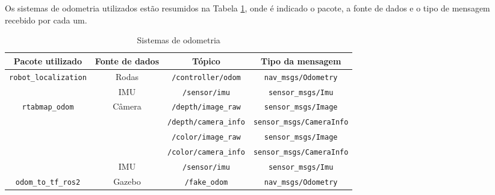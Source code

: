 \documentclass[repeatfields,xlists,xpacks,oneside,yearsonly]{ufrgscca}
\begin{document}
Os sistemas de odometria utilizados estão resumidos na Tabela
\ref{tab:odometria}, onde é indicado o pacote, a fonte de dados e o
tipo de mensagem recebido por cada um.

\begin{table}[H]
    \begin{center}
        \caption{Sistemas de odometria}
        \label{tab:odometria}
        \small
        \begin{tabularx}{\linewidth}{c|c|c|c}
            Pacote utilizado                              & Fonte de dados          & Tópico                       & Tipo da mensagem                 \\
            \hline
            \multirow{2}{*}{\texttt{robot\_localization}} & Rodas                   & \texttt{/controller/odom}    & \texttt{nav\_msgs/Odometry}      \\
                                                          & IMU                     & \texttt{/sensor/imu}         & \texttt{sensor\_msgs/Imu}        \\
            \hline
            \multirow{5}{*}{\texttt{rtabmap\_odom}}       & \multirow{4}{*}{Câmera} & \texttt{/depth/image\_raw}   & \texttt{sensor\_msgs/Image}      \\
                                                          &                         & \texttt{/depth/camera\_info} & \texttt{sensor\_msgs/CameraInfo} \\
                                                          &                         & \texttt{/color/image\_raw}   & \texttt{sensor\_msgs/Image}      \\
                                                          &                         & \texttt{/color/camera\_info} & \texttt{sensor\_msgs/CameraInfo} \\
                                                          & IMU                     & \texttt{/sensor/imu}         & \texttt{sensor\_msgs/Imu}        \\
            \hline
            \texttt{odom\_to\_tf\_ros2}                   & Gazebo                  & \texttt{/fake\_odom}         & \texttt{nav\_msgs/Odometry}      \\
        \end{tabularx}
    \end{center}
\end{table}
\end{document}
